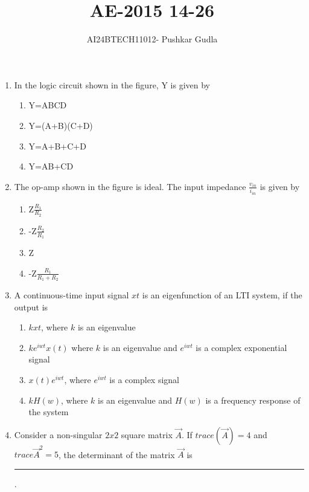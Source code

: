 \documentclass[journal,12pt,onecolumn]{IEEEtran}
\theoremstyle{remark}
\begin{document}

\vspace{3cm}

\title{\textbf{AE-2015 14-26}}
\author{AI24BTECH11012- Pushkar Gudla}
\maketitle
\bigskip

\renewcommand{\thefigure}{\theenumi}
\renewcommand{\thetable}{\theenumi}
\setlength{\columnsep}{2.5em}

\begin{enumerate}
    \item In the logic circuit shown in the figure, Y is given by
    
    \begin{enumerate}
    \item Y=ABCD
    \item Y=(A+B)(C+D)
    \item Y=A+B+C+D
    \item Y=AB+CD
    \end{enumerate}
    
    \item The op-amp shown in the figure is ideal. The input impedance $\frac{v_{in}}{i_{in}}$ is given by
    
    \begin{enumerate}
    \item Z$\frac{R_1}{R_2}$
    \item -Z$\frac{R_2}{R_1}$
    \item Z
    \item -Z$\frac{R_1}{R_1+R_2}$
    \end{enumerate}
    
    \item A continuous-time input signal $x{t}$ is an eigenfunction of an LTI system, if the output is
    \begin{enumerate}
    \item $kx{t}$, where $k$ is an eigenvalue
    \item $ke^{iwt}x(t)$ where $k$ is an eigenvalue and $e^{iwt}$ is a complex exponential signal
    \item $x(t)e^{iwt}$, where $e^{iwt}$ is a complex signal
    \item $kH(w)$, where $k$ is an eigenvalue and $H(w)$ is a frequency response of the system
    \end{enumerate}
    
    \item Consider a non-singular $2x2$ square matrix $\vec{A}$. If $trace(\vec{A})=4$ and $trace{\vec{A}^2}=5$, the determinant of the matrix $\vec{A}$ is \rule{2.5cm}{0.4pt}.
    

\end{enumerate}
\end{document}
